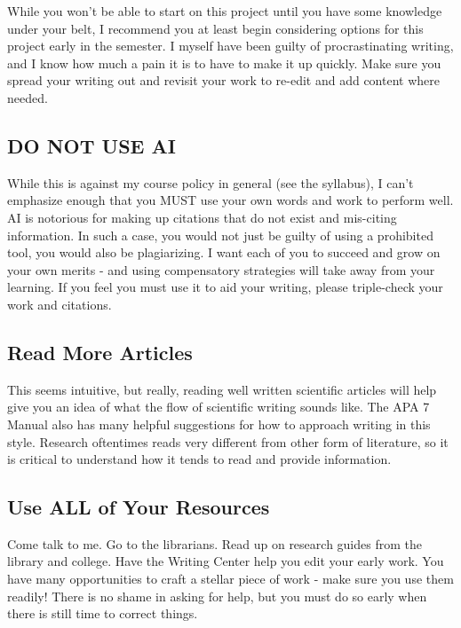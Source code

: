 \documentclass[
  12pt,
  letterpaper,
]{scrartcl}
\begin{document}
While you won't be able to start on this project until you have some
knowledge under your belt, I recommend you at least begin considering
options for this project early in the semester. I myself have been
guilty of procrastinating writing, and I know how much a pain it is to
have to make it up quickly. Make sure you spread your writing out and
revisit your work to re-edit and add content where needed.

\subsection{DO NOT USE AI}\label{do-not-use-ai}

While this is against my course policy in general (see the syllabus), I
can't emphasize enough that you MUST use your own words and work to
perform well. AI is notorious for making up citations that do not exist
and mis-citing information. In such a case, you would not just be guilty
of using a prohibited tool, you would also be plagiarizing. I want each
of you to succeed and grow on your own merits - and using compensatory
strategies will take away from your learning. If you feel you must use
it to aid your writing, please triple-check your work and citations.

\subsection{Read More Articles}\label{read-more-articles}

This seems intuitive, but really, reading well written scientific
articles will help give you an idea of what the flow of scientific
writing sounds like. The APA 7 Manual also has many helpful suggestions
for how to approach writing in this style. Research oftentimes reads
very different from other form of literature, so it is critical to
understand how it tends to read and provide information.

\subsection{Use ALL of Your Resources}\label{use-all-of-your-resources}

Come talk to me. Go to the librarians. Read up on research guides from
the library and college. Have the Writing Center help you edit your
early work. You have many opportunities to craft a stellar piece of work
- make sure you use them readily! There is no shame in asking for help,
but you must do so early when there is still time to correct things.
\end{document}
